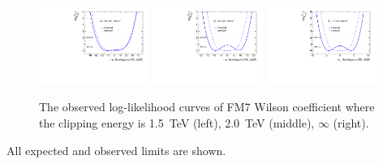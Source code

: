 \begin{figure}[ht]
    \centering
    \includegraphics[width=0.32\textwidth]{figures/aQGC/profileFM71500}
    	\includegraphics[width=0.32\textwidth]{figures/aQGC/profileFM72000}
        \includegraphics[width=0.32\textwidth]{figures/aQGC/profileFM7inf}
        \caption{The observed log-likelihood curves of FM7 Wilson coefficient where the clipping energy is 1.5~TeV (left), 2.0~TeV (middle), $\infty$ (right).}
        \label{fig:ProfileLL}
\end{figure}


All expected and observed limits are shown.

